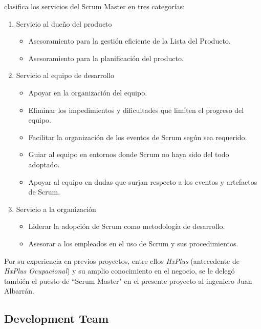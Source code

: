         \citeauthor{scrum-guia}\cite{scrum-guia} clasifica los servicios del Scrum Master en tres categorías:
        \begin{enumerate}
            \item Servicio al dueño del producto
            \begin{itemize}
                \item Asesoramiento para la gestión eficiente de la Lista del Producto.
                \item Asesoramiento para la planificación del producto.
            \end{itemize}
            
            \item Servicio al equipo de desarrollo
            \begin{itemize}
                \item Apoyar en la organización del equipo.
                \item Eliminar los impedimientos y dificultades que limiten el progreso del equipo.
                \item Facilitar la organización de los eventos de Scrum según sea requerido.
                \item Guiar al equipo en entornos donde Scrum no haya sido del todo adoptado.
                \item Apoyar al equipo en dudas que surjan respecto a los eventos y artefactos de Scrum.
            \end{itemize}
            \item Servicio a la organización
            \begin{itemize}
                \item Liderar la adopción de Scrum como metodología de desarrollo.
                \item Asesorar a los empleados en el uso de Scrum y sus procedimientos.
            \end{itemize}
        \end{enumerate}
        
       Por su experiencia en previos proyectos, entre ellos \textit{HxPlus} (antecedente de \textit{HxPlus Ocupacional}) y su amplio conocimiento en el negocio, se le delegó también el puesto de ``Scrum Master" en el presente proyecto al ingeniero Juan Albarrán.
        
        \subsection{Development Team}
        \label{development-team}
        

